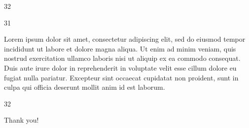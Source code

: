 \documentclass{ropas-poster}
\begin{document}
\begin{postergrid}{3}{2}
    \begin{posterblock}{3}{1}

      Lorem ipsum dolor sit amet, consectetur adipiscing elit, sed do eiusmod tempor incididunt ut labore et dolore magna aliqua.
      Ut enim ad minim veniam, quis nostrud exercitation ullamco laboris nisi ut aliquip ex ea commodo consequat.
      Duis aute irure dolor in reprehenderit in voluptate velit esse cillum dolore eu fugiat nulla pariatur.
      Excepteur sint occaecat cupidatat non proident, sunt in culpa qui officia deserunt mollit anim id est laborum.
    \end{posterblock}

    \begin{posterblock}{3}{2}

      Thank you!
    \end{posterblock}
  \end{postergrid}
\end{document}
